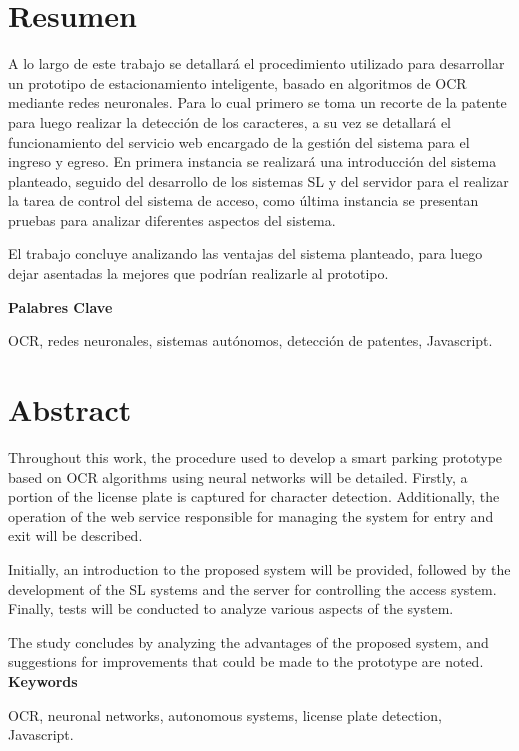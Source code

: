 \chapter*{Resumen}
A lo largo de este trabajo se detallará el procedimiento utilizado para desarrollar un prototipo de estacionamiento inteligente, basado en algoritmos de OCR mediante redes neuronales. Para lo cual primero se toma un recorte de la patente para luego realizar la detección de los caracteres, a su vez se detallará el funcionamiento del servicio web encargado de la gestión del sistema para el ingreso y egreso.
En primera instancia se realizará una introducción del sistema planteado, seguido del desarrollo de los sistemas SL y  del servidor para el realizar la tarea de control del sistema de acceso, como última instancia se presentan pruebas para analizar diferentes aspectos del sistema.

El trabajo concluye analizando las ventajas del sistema planteado, para luego dejar asentadas la mejores que podrían realizarle al prototipo.



\vspace*{\fill}
\noindent \textbf{Palabres Clave} 

OCR, redes neuronales, sistemas autónomos, detección de patentes, Javascript.

\chapter*{Abstract}
Throughout this work, the procedure used to develop a smart parking prototype based on OCR algorithms using neural networks will be detailed. Firstly, a portion of the license plate is captured for character detection. Additionally, the operation of the web service responsible for managing the system for entry and exit will be described.

Initially, an introduction to the proposed system will be provided, followed by the development of the SL systems and the server for controlling the access system. Finally, tests will be conducted to analyze various aspects of the system.

The study concludes by analyzing the advantages of the proposed system, and suggestions for improvements that could be made to the prototype are noted.
\vspace*{\fill}
\noindent \textbf{Keywords} 

OCR, neuronal networks, autonomous systems, license plate detection, Javascript.